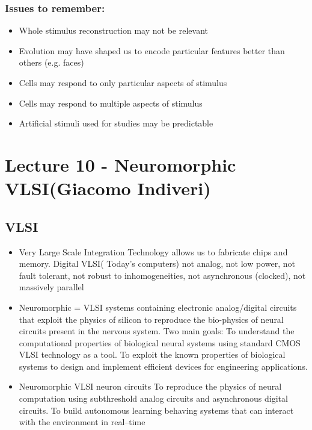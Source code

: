 \documentclass[english,11pt]{article}
\begin{document}
\subsubsection {Issues to remember:}
\begin{itemize}
\item Whole stimulus reconstruction may not be relevant
\item Evolution may have shaped us to encode particular features better than others (e.g. faces)
\item Cells may respond to only particular aspects of stimulus
\item Cells may respond to multiple aspects of stimulus
\item Artificial stimuli used for studies may be predictable
\end{itemize}







\section{Lecture 10 - Neuromorphic VLSI(Giacomo Indiveri)} 
\subsection{VLSI}
\begin{itemize}
\item Very Large Scale Integration Technology allows us to fabricate chips and memory. Digital VLSI( Today's computers) not analog, not low power, not fault tolerant, not robust to inhomogeneities, not asynchronous (clocked), not massively parallel
\item Neuromorphic = VLSI systems containing electronic analog/digital circuits that exploit the physics of silicon to reproduce the bio-physics of neural circuits present in the nervous system. Two main goals:
\subitem To understand the computational properties of biological neural systems using standard CMOS VLSI technology as a tool.
\subitem To exploit the known properties of biological systems to design and implement efficient devices for engineering applications.
\item Neuromorphic VLSI neuron circuits
\subitem To reproduce the physics of neural computation using subthreshold analog circuits and asynchronous digital circuits.
\subitem To build autonomous learning behaving systems that can interact with the environment in real–time
\end{itemize}
\end{document}
